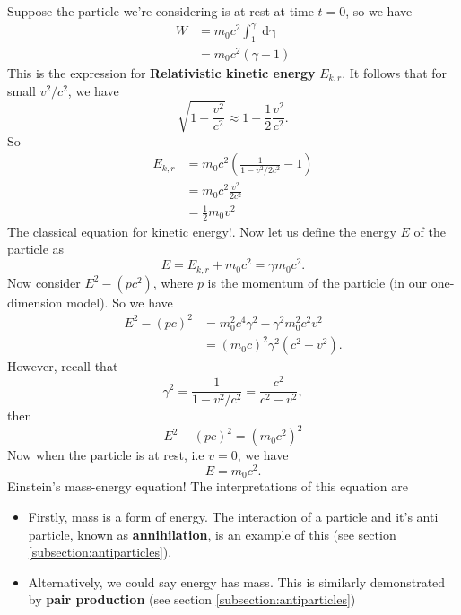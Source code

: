 Suppose the particle we're considering is at rest at time $t = 0$, so we have
\begin{align}
    W &= m_0 c^2 \int_1^\gamma \mathop{\mathrm{d}\gamma} \\
    &= m_0 c^2 (\gamma - 1)
\end{align}
This is the expression for \textbf{Relativistic kinetic energy} $E_{k,r}$. It follows that for small $v^2/c^2$, we have
\begin{equation}
    \sqrt{1 - \frac{v^2}{c^2}} \approx 1 - \frac{1}{2}\frac{v^2}{c^2}.
\end{equation}
So 
\begin{align}
    E_{k,r} &= m_0 c^2 \left(\frac{1}{1-v^2/2c^2} - 1\right) \\
    &= m_0 c^2 \frac{v^2}{2c^2} \\
    &= \frac{1}{2} m_0 v^2
\end{align}
The classical equation for kinetic energy!. Now let us define the energy $E$ of the particle as 
\begin{equation}
    E = E_{k,r} + m_0 c^2 = \gamma m_0 c^2.
\end{equation}
Now consider $E^2 - (pc^2)$, where $p$ is the momentum of the particle (in our one-dimension model). So we have
\begin{align}
    E^2 - (pc)^2 &= m_0^2 c^4 \gamma^2 - \gamma^2 m_0^2 c^2 v^2 \\
    &= (m_0c)^2 \gamma^2 (c^2 - v^2).
\end{align}
However, recall that
\begin{equation}
    \gamma^2 = \frac{1}{1-v^2/c^2} = \frac{c^2}{c^2 - v^2},
\end{equation}
then
\begin{equation}
    E^2 - (pc)^2 = (m_0c^2)^2
\end{equation}
Now when the particle is at rest, i.e $v = 0$, we have
\begin{equation}
    E = m_0 c^2.
\end{equation}
Einstein's mass-energy equation! The interpretations of this equation are
\begin{itemize}
    \item Firstly, mass is a form of energy. The interaction of a particle and it's anti particle, known as \textbf{annihilation}, is an example of this (see section \ref{subsection:antiparticles}).
    \item Alternatively, we could say energy has mass. This is similarly demonstrated by \textbf{pair production} (see section \ref{subsection:antiparticles})
\end{itemize}  


